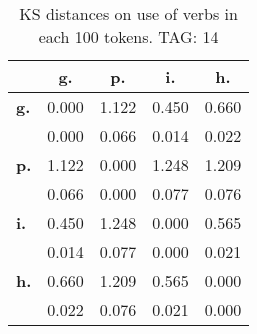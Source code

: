\begin{table}[h!]
\begin{center}
\begin{tabular}{| l || c | c | c | c |}\hline
 & {\bf g.} & {\bf p.} & {\bf i.} & {\bf h.} \\\hline\hline
{\bf g.} & 0.000 & 1.122 & 0.450 & 0.660 \\
{\bf } & 0.000 & 0.066 & 0.014 & 0.022 \\\hline
{\bf p.} & 1.122 & 0.000 & 1.248 & 1.209 \\
{\bf } & 0.066 & 0.000 & 0.077 & 0.076 \\\hline
{\bf i.} & 0.450 & 1.248 & 0.000 & 0.565 \\
{\bf } & 0.014 & 0.077 & 0.000 & 0.021 \\\hline
{\bf h.} & 0.660 & 1.209 & 0.565 & 0.000 \\
{\bf } & 0.022 & 0.076 & 0.021 & 0.000 \\\hline
\end{tabular}
\caption{KS distances on use of verbs in each 100 tokens. TAG: 14}
\end{center}
\end{table}